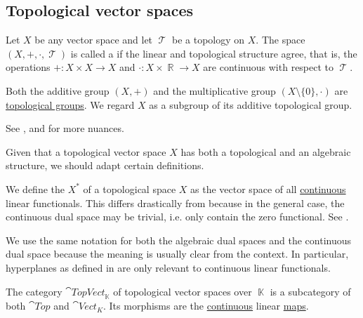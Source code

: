 \subsection{Topological vector spaces}\label{subsec:topological_vector_spaces}

\begin{definition}\label{def:topological_vector_space}
  Let \( X \) be any vector space and let \( \mscrT \) be a topology on \( X \). The space \( (X, +, \cdot, \mscrT) \) is called a  if the linear and topological structure agree, that is, the operations \( +: X \times X \to X \) and \( \cdot: X \times \BbbR \to X \) are continuous with respect to \( \mscrT \).

  Both the additive group \( (X, +) \) and the multiplicative group \( (X \setminus \{ 0 \}, \cdot) \) are \hyperref[def:topological_group]{topological groups}. We regard \( X \) as a subgroup of its additive topological group.

  See ,  and  for more nuances.
\end{definition}

Given that a topological vector space \( X \) has both a topological and an algebraic structure, we should adapt certain definitions.

\begin{definition}\label{def:continuous_dual_space}
  We define the  \( X^* \) of a topological space \( X \) as the vector space of all \hyperref[def:global_continuity]{continuous} linear functionals. This differs drastically from  because in the general case, the continuous dual space may be trivial, i.e. only contain the zero functional. See .

  We use the same notation for both the algebraic dual spaces and the continuous dual space because the meaning is usually clear from the context. In particular, hyperplanes as defined in  are only relevant to continuous linear functionals.
\end{definition}

\begin{definition}\label{def:category_of_topological_vector_spaces}
  The category \( \cat{TopVect}_{\BbbK} \) of topological vector spaces over \( \BbbK \) is a subcategory of both \( \cat{Top} \) and \( \cat{Vect}_K \). Its morphisms are the \hyperref[def:global_continuity]{continuous} linear \hyperref[def:semimodule/homomorphism]{maps}.
\end{definition}

